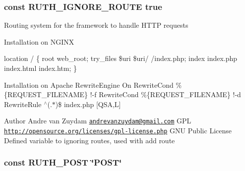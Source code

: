 \subsubsection[{R\+U\+T\+H\+\_\+\+I\+G\+N\+O\+R\+E\+\_\+\+R\+O\+U\+T\+E}]{\setlength{\rightskip}{0pt plus 5cm}const R\+U\+T\+H\+\_\+\+I\+G\+N\+O\+R\+E\+\_\+\+R\+O\+U\+T\+E true}\label{Ruth_8php_a007827b20a122223418cd0bed933b32c}
Routing system for the framework to handle H\+T\+T\+P requests

Installation on N\+G\+I\+N\+X

location / \{ root web\+\_\+root; try\+\_\+files \$uri \$uri/ /index.php; index index.\+php index.\+html index.\+htm; \}

Installation on Apache Rewrite\+Engine On Rewrite\+Cond \%\{R\+E\+Q\+U\+E\+S\+T\+\_\+\+F\+I\+L\+E\+N\+A\+M\+E\} !-\/f Rewrite\+Cond \%\{R\+E\+Q\+U\+E\+S\+T\+\_\+\+F\+I\+L\+E\+N\+A\+M\+E\} !-\/d Rewrite\+Rule $^\wedge$(.$\ast$)\$ index.\+php \mbox{[}Q\+S\+A,L\mbox{]}

\begin{DoxyAuthor}{Author}
Andre van Zuydam \href{mailto:andrevanzuydam@gmail.com}{\tt andrevanzuydam@gmail.\+com}  G\+P\+L  \href{http://opensource.org/licenses/gpl-license.php}{\tt http\+://opensource.\+org/licenses/gpl-\/license.\+php} G\+N\+U Public License Defined variable to ignoring routes, used with add route 
\end{DoxyAuthor}
\hypertarget{Ruth_8php_af749f90f066c3572c6dae5f01eb61af8}{}
\subsubsection[{R\+U\+T\+H\+\_\+\+P\+O\+S\+T}]{\setlength{\rightskip}{0pt plus 5cm}const R\+U\+T\+H\+\_\+\+P\+O\+S\+T \char`\"{}P\+O\+S\+T\char`\"{}}\label{Ruth_8php_af749f90f066c3572c6dae5f01eb61af8}
